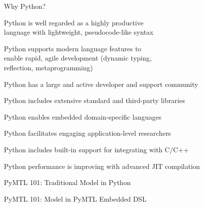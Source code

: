 \begin{frame}{Why Python?}


  \begin{cbxlist}

    \1 Python is well regarded as a highly productive \\ language with
       lightweight, pseudocode-like syntax

    \1 Python supports modern language features to \\ enable rapid, agile
       development (dynamic typing, \\ reflection, metaprogramming)

    \1 Python has a large and active developer and support community

    \1 Python includes extensive standard and third-party libraries

    \1 Python enables embedded domain-specific languages

    \1 Python facilitates engaging application-level researchers

    \1 Python includes built-in support for integrating with C/C++

    \1 Python performance is improving with advanced JIT compilation

  \end{cbxlist}

\end{frame}

\begin{frame}{PyMTL 101: Traditional Model in Python}
\end{frame}

\begin{frame}{PyMTL 101: Model in PyMTL Embedded DSL}
\end{frame}

